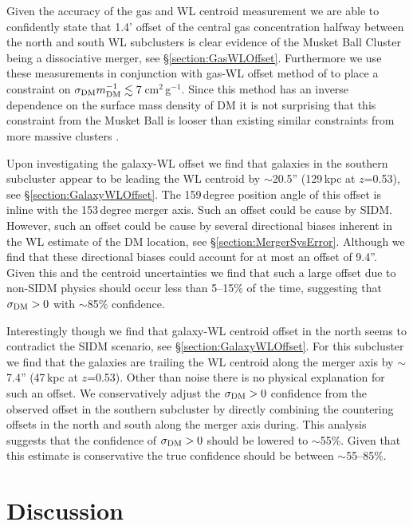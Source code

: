 Given the accuracy of the gas and WL centroid measurement we are able to confidently state that 1.4' offset of the central gas concentration halfway between the north and south WL subclusters is clear evidence of the Musket Ball Cluster being a dissociative merger, see \S\ref{section:GasWLOffset}.
Furthermore we use these measurements in conjunction with gas-WL offset method of \citet{Markevitch:2004dl} to place a constraint on $\sigma_{\rm DM} m_{\rm DM}^{-1} \lesssim 7$\,cm$^2$\,g$^{-1}$.
Since this method has an inverse dependence on the surface mass density of DM it is not surprising that this constraint from the Musket Ball is looser than existing similar constraints from more massive clusters \citep{Markevitch:2004dl, Bradac:2008gw, Merten:2011gu}.

Upon investigating the galaxy-WL offset we find that galaxies in the southern subcluster appear to be leading the WL centroid by $\sim$20.5'' (129\,kpc at $z$=0.53), see \S\ref{section:GalaxyWLOffset}.
The 159\,degree position angle of this offset is inline with the 153\,degree merger axis.
Such an offset could be cause by SIDM.
However, such an offset could be cause by several directional biases inherent in the WL estimate of the DM location, see \S\ref{section:MergerSysError}.
Although we find that these directional biases could account for at most an offset of 9.4''.
Given this and the centroid uncertainties we find that such a large offset due to non-SIDM physics should occur less than 5--15\% of the time, suggesting that $\sigma_{\rm DM}>0$ with $\sim$85\% confidence.

Interestingly though we find that galaxy-WL centroid offset in the north seems to contradict the SIDM scenario, see \S\ref{section:GalaxyWLOffset}.
For this subcluster we find that the galaxies are trailing the WL centroid along the merger axis by $\sim$7.4'' (47\,kpc at $z$=0.53).
Other than noise there is no physical explanation for such an offset.
We conservatively adjust the $\sigma_{\rm DM}>0$ confidence from the observed offset in the southern subcluster by directly combining the countering offsets in the north and south along the merger axis during.
This analysis suggests that the confidence of $\sigma_{\rm DM}>0$ should be lowered to $\sim$55\%.
Given that this estimate is conservative the true confidence should be between $\sim$55--85\%.


\section{Discussion}

